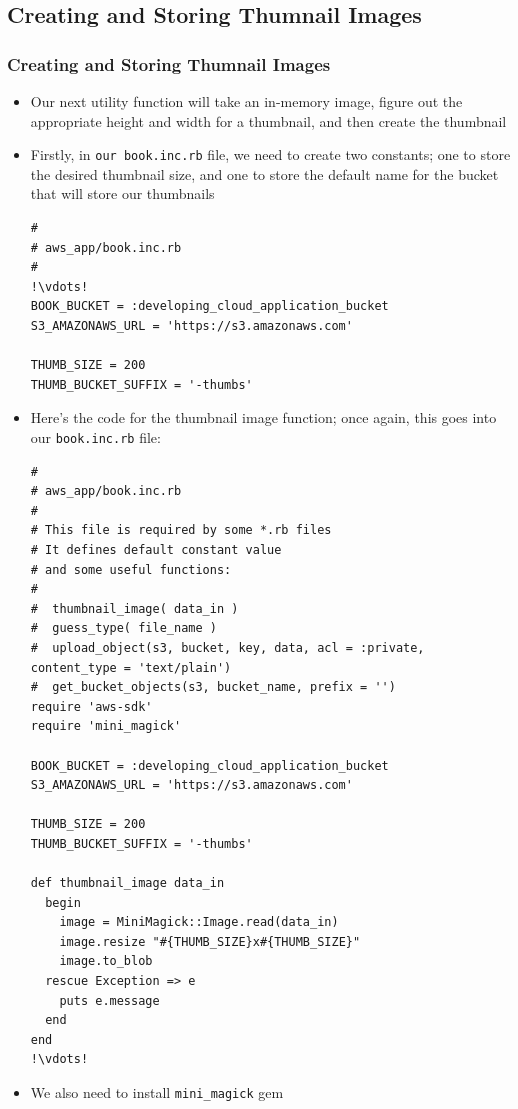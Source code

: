 \documentclass{beamer}
\begin{document}
\subsection{Creating and Storing Thumnail Images}
\begin{frame}
\frametitle{Creating and Storing Thumnail Images}
\begin{itemize}
\item Our next utility function will take an in-memory image, figure out the appropriate
height and width for a thumbnail, and then create the thumbnail
\item Firstly, in \texttt{our book.inc.rb} file, we need to create two constants; one to store the
desired thumbnail size, and one to store the default name for the bucket that will
store our thumbnails

\lstset{language=Ruby, style=eclipse}
\begin{lstlisting}[escapechar=!]
#
# aws_app/book.inc.rb
#
!\vdots!
BOOK_BUCKET = :developing_cloud_application_bucket
S3_AMAZONAWS_URL = 'https://s3.amazonaws.com'

THUMB_SIZE = 200
THUMB_BUCKET_SUFFIX = '-thumbs'
\end{lstlisting}

\item Here’s the code for the thumbnail image function; once again, this goes into our \texttt{book.inc.rb} file:
\lstset{language=Ruby, style=eclipse}
\begin{lstlisting}[escapechar=!]
#
# aws_app/book.inc.rb
#
# This file is required by some *.rb files
# It defines default constant value
# and some useful functions:
#
#  thumbnail_image( data_in )
#  guess_type( file_name )
#  upload_object(s3, bucket, key, data, acl = :private, content_type = 'text/plain')
#  get_bucket_objects(s3, bucket_name, prefix = '')
require 'aws-sdk'
require 'mini_magick'

BOOK_BUCKET = :developing_cloud_application_bucket
S3_AMAZONAWS_URL = 'https://s3.amazonaws.com'

THUMB_SIZE = 200
THUMB_BUCKET_SUFFIX = '-thumbs'

def thumbnail_image data_in
  begin
    image = MiniMagick::Image.read(data_in)
    image.resize "#{THUMB_SIZE}x#{THUMB_SIZE}"
    image.to_blob
  rescue Exception => e
    puts e.message
  end
end
!\vdots!
\end{lstlisting}

\item We also need to install \texttt{mini\_magick} gem


\end{itemize}
\end{frame}
\end{document}
